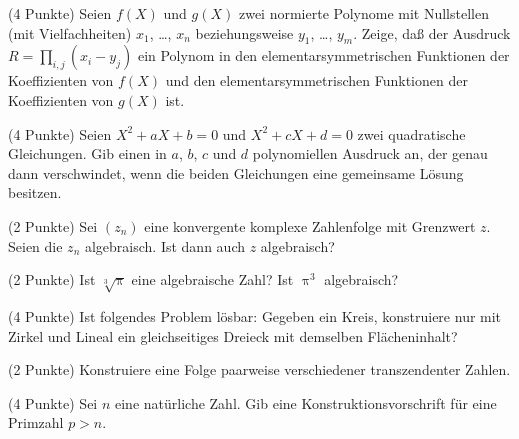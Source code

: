 \documentclass{algsheet}
\begin{document}
\begin{exercise}(4 Punkte)\newline
    Seien \(f(X)\) und \(g(X)\) zwei normierte Polynome mit Nullstellen (mit Vielfachheiten)
    \(x_1\), \dots, \(x_n\) beziehungsweise \(y_1\), \dots, \(y_m\). Zeige, daß
    der Ausdruck \(R = \prod\limits_{i, j} (x_i - y_j)\) ein Polynom in den
    elementarsymmetrischen Funktionen der Koeffizienten von \(f(X)\)
    und den elementarsymmetrischen Funktionen der Koeffizienten von \(g(X)\) ist.
\end{exercise}

\begin{exercise}(4 Punkte)\newline
    Seien \(X^2 + a X + b = 0\) und \(X^2 + c X + d = 0\) zwei quadratische
    Gleichungen. Gib einen in \(a\), \(b\), \(c\) und \(d\) polynomiellen
    Ausdruck an, der genau dann verschwindet, wenn die beiden Gleichungen eine
    gemeinsame Lösung besitzen.
\end{exercise}




\begin{exercise}(2 Punkte)\newline
    Sei \((z_n)\) eine konvergente komplexe Zahlenfolge mit Grenzwert \(z\).
    Seien die \(z_n\) algebraisch. Ist dann auch \(z\) algebraisch?
\end{exercise}



\begin{exercise}(2 Punkte)\newline
     Ist \(\sqrt[3] \uppi\) eine algebraische Zahl? Ist \(\uppi^3\) algebraisch?
\end{exercise}




\begin{exercise}(4 Punkte)\newline
    Ist folgendes Problem lösbar: Gegeben ein Kreis, konstruiere nur mit Zirkel
    und Lineal ein gleichseitiges Dreieck mit demselben Flächeninhalt?
\end{exercise}




\begin{exercise}(2 Punkte)\newline
     Konstruiere eine Folge paarweise verschiedener transzendenter Zahlen.
\end{exercise}



\begin{exercise}(4 Punkte)\newline
    Sei \(n\) eine natürliche Zahl. Gib eine Konstruktionsvorschrift für eine
    Primzahl \(p > n\).
\end{exercise}
\end{document}
